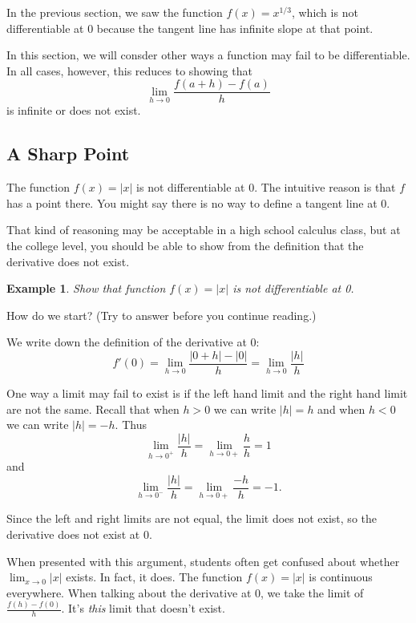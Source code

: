 \documentclass[11pt]{book}
\newcounter{error}[chapter]
\newtheorem{example}{Example}
\numberwithin{example}{chapter}
\begin{document}
In the previous section, we saw the function $f(x)=x^{1/3}$, which is not differentiable at 0 because the tangent line has infinite slope at that point.  

In this section, we will consder other ways a function may fail to be differentiable.  In all cases, however, this reduces to showing that
$$\lim_{h\to 0}\frac{f(a+h)-f(a)}{h}$$
is infinite or does not exist.

\subsection{A Sharp Point}

The function $f(x)=|x|$ is not differentiable at 0.  The intuitive reason is that $f$ has a point there.  You might say there is no way to define a tangent line at 0.  

That kind of reasoning may be acceptable in a high school calculus class, but at the college level, you should be able to show from the definition that the derivative does not exist.

\begin{example}
Show that function $f(x)=|x|$ is not differentiable at 0.
\end{example}

How do we start?  (Try to answer before you continue reading.)

We write down the definition of the derivative at 0:
$$f'(0) = \lim_{h\to 0}\frac{|0+h|-|0|}{h}= \lim_{h\to 0}\frac{|h|}{h}$$

One way a limit may fail to exist is if the left hand limit and the right hand limit are not the same.  Recall that when $h>0$ we can write $|h|=h$ and when $h<0$ we can write $|h|=-h$.  Thus
$$\lim_{h\to 0^+}\frac{|h|}{h}=\lim_{h\to 0+}\frac{h}{h}=1$$ 
and 
$$\lim_{h\to 0^-}\frac{|h|}{h}=\lim_{h\to 0+}\frac{-h}{h}=-1.$$ 



Since the left and right limits are not equal, the limit does not exist, so the derivative does not exist at 0.  


\begin{error}
When presented with this argument, students often get confused about whether $\lim_{x\to 0} |x|$ exists.  In fact, it does.  The function $f(x)=|x|$ is continuous everywhere.  When talking about the derivative at 0, we take the limit of $\frac{f(h)-f(0)}{h}$.  It's \emph{this} limit that doesn't exist.  

\end{error}
\end{document}
